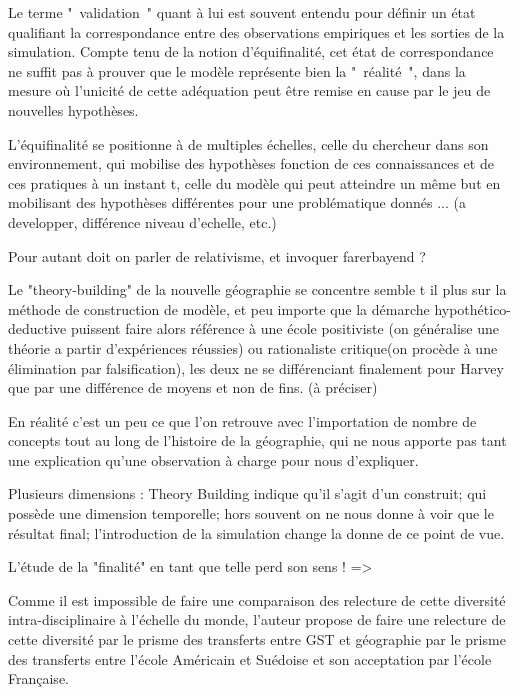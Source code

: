 {Le terme " validation " quant à lui est souvent entendu pour définir un état qualifiant la correspondance entre des observations empiriques et les sorties de la simulation. Compte tenu de la notion d'équifinalité, cet état de correspondance ne suffit pas à prouver que le modèle représente bien la " réalité ", dans la mesure où l’unicité de  cette adéquation peut être remise en cause par le jeu de nouvelles hypothèses.

L'équifinalité se positionne à de multiples échelles, celle du chercheur dans son environnement, qui mobilise des hypothèses fonction de ces connaissances et de ces pratiques à un instant t, celle du modèle qui peut atteindre un même but en mobilisant des hypothèses différentes pour une problématique donnés ... (a developper, différence niveau d'echelle, etc.)

Pour autant doit on parler de relativisme, et invoquer farerbayend ? 

Le "theory-building" de la nouvelle géographie se concentre semble t il plus sur la méthode de construction de modèle, et peu importe que la démarche hypothético-deductive puissent faire alors référence à une école positiviste (on généralise une théorie a partir d'expériences réussies) ou rationaliste critique(on procède à une élimination par falsification), les deux ne se différenciant finalement pour Harvey que par une différence de moyens et non de fins. (à préciser)

En réalité c'est un peu ce que l'on retrouve avec l'importation de nombre de concepts tout au long de l'histoire de la géographie, qui ne nous apporte pas tant une explication qu'une observation à charge pour nous d'expliquer.

Plusieurs dimensions : Theory Building indique qu'il s'agit d'un construit; qui possède une dimension temporelle; hors souvent on ne nous donne à voir que le résultat final; l'introduction de la simulation change la donne de ce point de vue.

L'étude de la "finalité" en tant que telle perd son sens ! => 

Comme il est impossible de faire une comparaison des relecture de cette diversité intra-disciplinaire à l'échelle du monde, l'auteur propose de faire une relecture de cette diversité par le prisme des transferts entre GST et géographie par le prisme des transferts entre l'école Américain et Suédoise et son acceptation par l'école Française.


}
